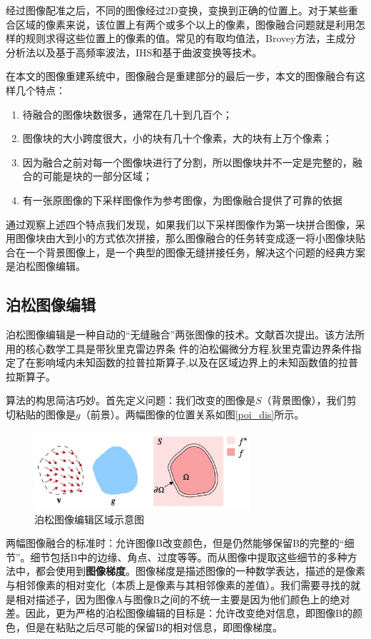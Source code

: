 经过图像配准之后，不同的图像经过2D变换，变换到正确的位置上。对于某些重合区域的像素来说，该位置上有两个或多个以上的像素，图像融合问题就是利用怎样的规则求得这些位置上的像素的值。常见的有取均值法，Brovey方法，主成分分析法以及基于高频率波法，IHS和基于曲波变换等技术。

在本文的图像重建系统中，图像融合是重建部分的最后一步，本文的图像融合有这样几个特点：

\begin{enumerate}
\item 待融合的图像块数很多，通常在几十到几百个；
\item 图像块的大小跨度很大，小的块有几十个像素，大的块有上万个像素；
\item 因为融合之前对每一个图像块进行了分割，所以图像块并不一定是完整的，融合的可能是块的一部分区域；
\item 有一张原图像的下采样图像作为参考图像，为图像融合提供了可靠的依据
\end{enumerate}

通过观察上述四个特点我们发现，如果我们以下采样图像作为第一块拼合图像，采用图像块由大到小的方式依次拼接，那么图像融合的任务转变成逐一将小图像块贴合在一个背景图像上，是一个典型的图像无缝拼接任务，解决这个问题的经典方案是泊松图像编辑。

\subsection{泊松图像编辑}
泊松图像编辑是一种自动的“无缝融合”两张图像的技术。文献\cite{Perez:2003ul}首次提出。该方法所用的核心数学工具是带狄里克雷边界条 件的泊松偏微分方程,狄里克雷边界条件指定了在影响域内未知函数的拉普拉斯算子,以及在区域边界上的未知函数值的拉普拉斯算子\cite{张建桥:2010vm}。

算法的构思简洁巧妙。首先定义问题：我们改变的图像是\(S\)（背景图像），我们剪切粘贴的图像是\(g\)（前景）。两幅图像的位置关系如图\ref{poi_dis}所示。

\begin{figure}
\centering\includegraphics[width=8.00cm]{imgs/ch2/poi_dis}
\caption{泊松图像编辑区域示意图}
\label{fig:poi_dis}
\end{figure}

两幅图像融合的标准时：允许图像B改变颜色，但是仍然能够保留B的完整的“细节”。细节包括B中的边缘、角点、过度等等。而从图像中提取这些细节的多种方法中，都会使用到\textbf{图像梯度}。图像梯度是描述图像的一种数学表达，描述的是像素与相邻像素的相对变化（本质上是像素与其相邻像素的差值）。我们需要寻找的就是相对描述子，因为图像A与图像B之间的不统一主要是因为他们颜色上的绝对差。因此，更为严格的泊松图像编辑的目标是：允许改变绝对信息，即图像B的颜色，但是在粘贴之后尽可能的保留B的相对信息，即图像梯度。

